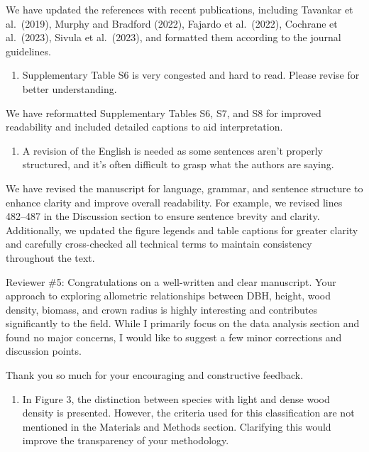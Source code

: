 \documentclass[
  12pt,
  letterpaper,
  DIV=11,
  numbers=noendperiod]{scrartcl}
\providecommand{\tightlist}{%
  \setlength{\itemsep}{0pt}\setlength{\parskip}{0pt}}\usepackage{longtable,booktabs,array}
\renewenvironment{quote}
  {\begin{customblockquote}\color{blockquote-text}\ignorespaces}
  {\end{customblockquote}}
\begin{document}
We have updated the references with recent publications, including
Tavankar et al.~(2019), Murphy and Bradford (2022), Fajardo et
al.~(2022), Cochrane et al.~(2023), Sivula et al.~(2023), and formatted
them according to the journal guidelines.

\begin{quote}
\begin{enumerate}
\def\labelenumi{\arabic{enumi})}
\setcounter{enumi}{7}
\tightlist
\item
  Supplementary Table S6 is very congested and hard to read. Please
  revise for better understanding.
\end{enumerate}
\end{quote}

We have reformatted Supplementary Tables S6, S7, and S8 for improved
readability and included detailed captions to aid interpretation.

\begin{quote}
\begin{enumerate}
\def\labelenumi{\arabic{enumi})}
\setcounter{enumi}{8}
\tightlist
\item
  A revision of the English is needed as some sentences aren't properly
  structured, and it's often difficult to grasp what the authors are
  saying.
\end{enumerate}
\end{quote}

We have revised the manuscript for language, grammar, and sentence
structure to enhance clarity and improve overall readability. For
example, we revised lines 482--487 in the Discussion section to ensure
sentence brevity and clarity. Additionally, we updated the figure
legends and table captions for greater clarity and carefully
cross-checked all technical terms to maintain consistency throughout the
text.

\begin{quote}
Reviewer \#5: Congratulations on a well-written and clear manuscript.
Your approach to exploring allometric relationships between DBH, height,
wood density, biomass, and crown radius is highly interesting and
contributes significantly to the field. While I primarily focus on the
data analysis section and found no major concerns, I would like to
suggest a few minor corrections and discussion points.
\end{quote}

Thank you so much for your encouraging and constructive feedback.

\begin{quote}
\begin{enumerate}
\def\labelenumi{\arabic{enumi})}
\tightlist
\item
  In Figure 3, the distinction between species with light and dense wood
  density is presented. However, the criteria used for this
  classification are not mentioned in the Materials and Methods section.
  Clarifying this would improve the transparency of your methodology.
\end{enumerate}
\end{quote}
\end{document}
